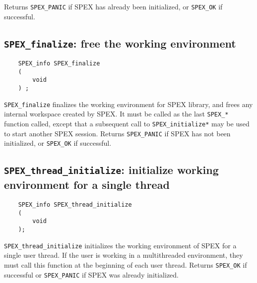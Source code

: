 \documentclass[12pt,oneside]{book}
\theoremstyle{definition}
\begin{document}
Returns \verb|SPEX_PANIC| if SPEX has already been initialized,
or \verb|SPEX_OK| if successful.


\subsection{\texttt{SPEX\_finalize}: free the working environment} \label{ss:SPEX_finalize}
\begin{mdframed}[userdefinedwidth=\textwidth]
{\footnotesize
\begin{verbatim}
    SPEX_info SPEX_finalize
    (
        void
    ) ;
\end{verbatim}
} \end{mdframed}

\verb|SPEX_finalize| finalizes the working environment for SPEX
library, and frees any internal workspace created by SPEX.  It must be
called as the last \verb|SPEX_*| function called, except that a subsequent
call to \verb|SPEX_initialize*| may be used to start another SPEX session.
Returns \verb|SPEX_PANIC| if SPEX has not been initialized,
or \verb|SPEX_OK| if successful.

\subsection{\texttt{SPEX\_thread\_initialize}: initialize working environment for a single thread}

\begin{mdframed}[userdefinedwidth=\textwidth]
{\footnotesize
\begin{verbatim}
    SPEX_info SPEX_thread_initialize 
    ( 
        void 
    );
\end{verbatim}
} \end{mdframed}

\verb|SPEX_thread_initialize| initializes the working environment of SPEX for a single
user thread. If the user is working in a multithreaded environment, they must call 
this function at the beginning of each user thread. Returns \verb|SPEX_OK| if successful 
or \verb|SPEX_PANIC| if SPEX was already initialized.
\end{document}
